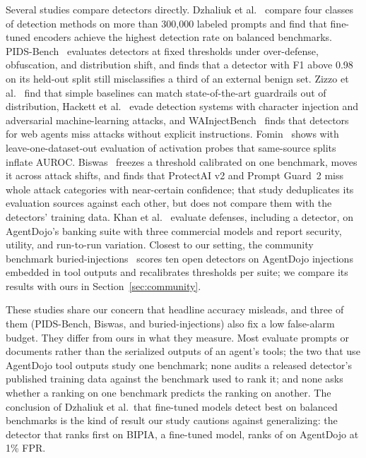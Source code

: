 Several studies compare detectors directly. Dzhaliuk et al.~\cite{dzhaliuk2026} compare four classes of detection methods on more than 300{,}000 labeled prompts and find that fine-tuned encoders achieve the highest detection rate on balanced benchmarks. PIDS-Bench~\cite{pidsbench} evaluates detectors at fixed thresholds under over-defense, obfuscation, and distribution shift, and finds that a detector with F1 above 0.98 on its held-out split still misclassifies a third of an external benign set. Zizzo et al.~\cite{zizzo2024} find that simple baselines can match state-of-the-art guardrails out of distribution, Hackett et al.~\cite{hackett2025} evade detection systems with character injection and adversarial machine-learning attacks, and WAInjectBench~\cite{wainjectbench} finds that detectors for web agents miss attacks without explicit instructions. Fomin~\cite{benchmarkslie} shows with leave-one-dataset-out evaluation of activation probes that same-source splits inflate AUROC. Biswas~\cite{biswas2026} freezes a threshold calibrated on one benchmark, moves it across attack shifts, and finds that ProtectAI v2 and Prompt Guard~2 miss whole attack categories with near-certain confidence; that study deduplicates its evaluation sources against each other, but does not compare them with the detectors' training data. Khan et al.~\cite{khan2026} evaluate defenses, including a detector, on AgentDojo's banking suite with three commercial models and report security, utility, and run-to-run variation. Closest to our setting, the community benchmark buried-injections~\cite{buriedinjections} scores ten open detectors on AgentDojo injections embedded in tool outputs and recalibrates thresholds per suite; we compare its results with ours in Section~\ref{sec:community}.

These studies share our concern that headline accuracy misleads, and three of them (PIDS-Bench, Biswas, and buried-injections) also fix a low false-alarm budget. They differ from ours in what they measure. Most evaluate prompts or documents rather than the serialized outputs of an agent's tools; the two that use AgentDojo tool outputs study one benchmark; none audits a released detector's published training data against the benchmark used to rank it; and none asks whether a ranking on one benchmark predicts the ranking on another. The conclusion of Dzhaliuk et al.\ that fine-tuned models detect best on balanced benchmarks is the kind of result our study cautions against generalizing: the detector that ranks first on BIPIA, a fine-tuned model, ranks \BestBipiaRankOnAD of \NDetectors on AgentDojo at 1\% FPR.
